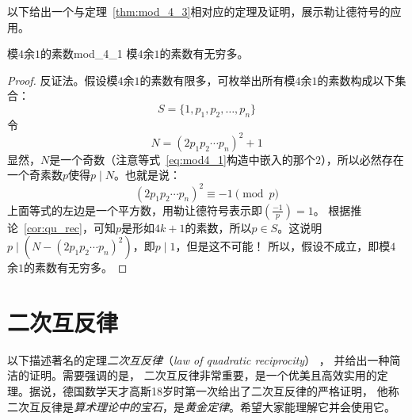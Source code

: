  以下给出一个与定理~\ref{thm:mod_4_3}相对应的定理及证明，展示勒让德符号的应用。
 \begin{proposition}{模$4$余$1$的素数}{mod_4_1}
 模$4$余$1$的素数有无穷多。
 \end{proposition}

\begin{proof}
反证法。假设模$4$余$1$的素数有限多，可枚举出所有模$4$余$1$的素数构成以下集合：
\[S = \{1, p_1, p_2, \ldots, p_n\}\]
令
\begin{equation}
\label{eq:mod4_1}
N = (2p_1p_2 \cdots p_n)^2 + 1
\end{equation}
显然，$N$是一个奇数（注意等式~\ref{eq:mod4_1}构造中嵌入的那个$2$），所以必然存在一个奇素数$p$使得$p \mid N$。也就是说：
\[(2p_1p_2 \cdots p_n)^2 \equiv -1 \pmod{p}\]
上面等式的左边是一个平方数，用勒让德符号表示即$\left(\frac{-1}{p}\right) = 1$。
根据推论~\ref{cor:qu_rec}，可知$p$是形如$4k + 1$的素数，所以$p \in S$。这说明
$p \mid (N - (2p_1p_2 \cdots p_n)^2 )$，即$p \mid 1$，但是这不可能！
所以，假设不成立，即模$4$余$1$的素数有无穷多。
\end{proof}

 
 \section{二次互反律}
以下描述著名的定理\emph{二次互反律}（\textit{law of quadratic reciprocity}） ，
并给出一种简洁的证明。需要强调的是，
二次互反律非常重要，是一个优美且高效实用的定理。据说，德国数学天才高斯18岁时第一次给出了二次互反律的严格证明，
他称二次互反律是\emph{算术理论中的宝石}，是\emph{黄金定律}。希望大家能理解它并会使用它。
 
